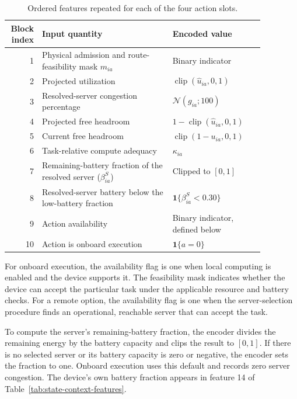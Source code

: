 \begin{table}[H]
\centering
\caption{Ordered features repeated for each of the four action slots.}
\label{tab:state-action-features}
\small
\setlength{\tabcolsep}{5pt}
\renewcommand{\arraystretch}{1.12}
\begin{tabular}{@{}r p{0.51\linewidth} p{0.36\linewidth}@{}}
\toprule
Block index & Input quantity & Encoded value \\
\midrule
1 & Physical admission and route-feasibility mask \(m_{ia}\) & Binary indicator \\
2 & Projected utilization & \(\operatorname{clip}(\widehat u_{ia},0,1)\) \\
3 & Resolved-server congestion percentage & \(\mathcal N(g_{ia};100)\) \\
4 & Projected free headroom & \(1-\operatorname{clip}(\widehat u_{ia},0,1)\) \\
5 & Current free headroom & \(\operatorname{clip}(1-u_{ia},0,1)\) \\
6 & Task-relative compute adequacy & \(\kappa_{ia}\) \\
7 & Remaining-battery fraction of the resolved server (\(\beta_{ia}^{S}\)) & Clipped to \([0,1]\) \\
8 & Resolved-server battery below the low-battery fraction & \(\mathbf 1\{\beta_{ia}^{S}<0.30\}\) \\
9 & Action availability & Binary indicator, defined below \\
10 & Action is onboard execution & \(\mathbf 1\{a=0\}\) \\
\bottomrule
\end{tabular}
\end{table}

For onboard execution, the availability flag is one when local computing is enabled and the device supports it.
The feasibility mask indicates whether the device can accept the particular task under the applicable resource and battery checks.
For a remote option, the availability flag is one when the server-selection procedure finds an operational, reachable server that can accept the task.

To compute the server's remaining-battery fraction, the encoder divides the remaining energy by the battery capacity and clips the result to \([0,1]\).
If there is no selected server or its battery capacity is zero or negative, the encoder sets the fraction to one.
Onboard execution uses this default and records zero server congestion.
The device's own battery fraction appears in feature 14 of Table~\ref{tab:state-context-features}.
